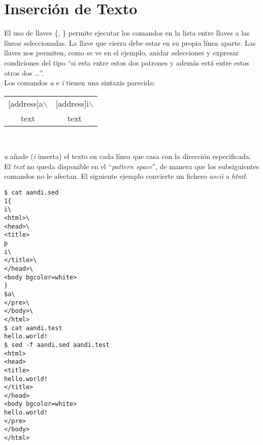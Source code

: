 \section{Inserción de Texto}
El uso de llaves \{, \} permite  ejecutar los comandos en la lista entre llaves
a las líneas seleccionadas. La llave que cierra debe estar en su propia línea aparte.
Las llaves nos permiten, como se ve en el ejemplo, anidar selecciones
y expresar condiciones del tipo ``si esta entre estos dos patrones y además 
está entre estos otros dos \ldots''.\\

Los comandos {\it a} e {\it i} tienen una sintaxis parecida:\\
{\it
\begin{tabular}{c|c}
	[address]a$\backslash$ & [address]i$\backslash$\\ 
        text                   & text\\
\end{tabular}\\
}
{\it a} añade ({\it i} inserta) el texto en cada línea que
casa con la dirección especificada.
El {\it text} no queda disponible en el ``{\it pattern space}'',
de manera que los subsiguientes comandos no le afectan. El
siguiente ejemplo convierte un fichero {\it ascii} a {\it html}:
\begin{verbatim}
$ cat aandi.sed
1{
i\
<html>\
<head>\
<title>
p
i\
</title>\
</head>\
<body bgcolor=white>
}
$a\
</pre>\
</body>\
</html>
$ cat aandi.test
hello.world!
$ sed -f aandi.sed aandi.test
<html>
<head>
<title>
hello.world!
</title>
</head>
<body bgcolor=white>
hello.world!
</pre>
</body>
</html>
\end{verbatim}

